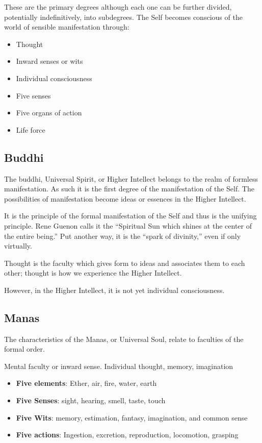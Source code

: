 These are the primary degrees although each one can be further divided, potentially indefinitively, into subdegrees. The Self becomes conscious of the world of sensible manifestation through:

\begin{itemize}
\item Thought 
\item Inward senses or wits 
\item Individual consciousness 
\item Five senses 
\item Five organs of action 
\item Life force 
\end{itemize}
\subsection*{Buddhi}
The buddhi, Universal Spirit, or Higher Intellect belongs to the realm of formless manifestation. As such it is the first degree of the manifestation of the Self. The possibilities of manifestation become ideas or essences in the Higher Intellect.

It is the principle of the formal manifestation of the Self and thus is the unifying principle. Rene Guenon calls it the “Spiritual Sun which shines at the center of the entire being.” Put another way, it is the “spark of divinity,” even if only virtually.

Thought is the faculty which gives form to ideas and associates them to each other; thought is how we experience the Higher Intellect.

However, in the Higher Intellect, it is not yet individual consciousness.

\subsection*{Manas}
The characteristics of the Manas, or Universal Soul, relate to faculties of the formal order.

Mental faculty or inward sense. Individual thought, memory, imagination

\begin{itemize}
\item\textbf{Five elements}: Ether, air, fire, water, earth
\item\textbf{Five Senses}: sight, hearing, smell, taste, touch
\item\textbf{Five Wits}: memory, estimation, fantasy, imagination, and common sense
\item\textbf{Five actions}: Ingestion, excretion, reproduction, locomotion, grasping
\end{itemize}


